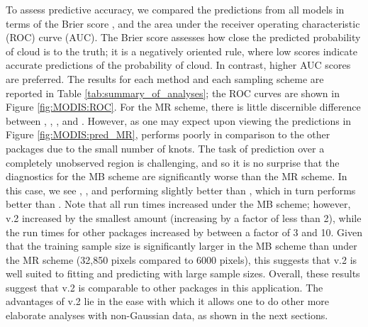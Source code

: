 \documentclass[nojss]{jss}
\begin{document}
To assess predictive accuracy, we compared the predictions from all models in terms of the Brier score \citep[Sec.~3]{Gneiting_2007_scoring_rules}, and the area under the receiver operating characteristic (ROC) curve (AUC). %
The Brier score assesses how close the predicted probability of cloud is to the truth; it is a negatively oriented rule, where low scores indicate accurate predictions of the probability of cloud.
In contrast, higher AUC scores are preferred.
The results for each method and each sampling scheme are reported in Table \ref{tab:summary_of_analyses}; the ROC curves are shown in Figure \ref{fig:MODIS:ROC}. 
For the MR scheme, there is little discernible difference between , , , and . 
 However, as one may expect upon viewing the predictions in Figure \ref{fig:MODIS:pred_MR},  performs poorly in comparison to the other packages due to the small number of knots. 
 The task of prediction over a completely unobserved region is challenging, and so it is no surprise that the diagnostics for the MB scheme are significantly worse than the MR scheme. 
 In this case, we see , , and  performing slightly better than , which in turn performs better than . 
 Note that all run times increased under the MB scheme; however,  v.2 increased by the smallest amount (increasing by a factor of less than 2), while the run times for other packages increased by between a factor of 3 and 10. 
 Given that the training sample size is significantly larger in the MB scheme than under the MR scheme (32,850 pixels compared to 6000 pixels), this suggests that  v.2 is well suited to fitting and predicting with large sample sizes.  
 Overall, these results suggest that  v.2 is comparable to other packages in this application. 
 The advantages of  v.2 lie in the ease with which it allows one to do other more elaborate analyses with non-Gaussian data, as shown in the next sections. 
 
 
\end{document}
